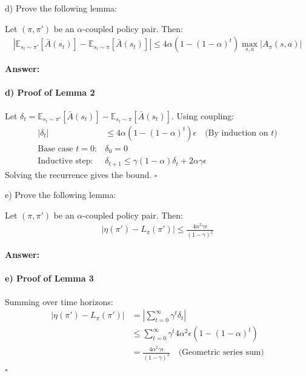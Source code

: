 d) Prove the following lemma:

\begin{lemma}
    Let $(\pi, \pi')$ be an $\alpha$-coupled policy pair. Then:
    \begin{align*}
        |\mathbb{E}_{s_t \sim \pi'}[\bar{A}(s_t)] - \mathbb{E}_{s_t \sim \pi}[\bar{A}(s_t)]| \le 4\alpha(1-(1-\alpha)^t)\max_{s, a}|A_\pi(s, a)|
    \end{align*}
\end{lemma}


\textbf{Answer:}

\paragraph{d) Proof of Lemma 2} Let $\delta_t = \mathbb{E}_{s_t \sim \pi'}[\bar{A}(s_t)] - \mathbb{E}_{s_t \sim \pi}[\bar{A}(s_t)]$. Using coupling:
\begin{align*}
|\delta_t| &\leq 4\alpha(1-(1-\alpha)^t)\epsilon \quad \text{(By induction on $t$)} \\
\text{Base case } t=0: & \delta_0 = 0 \\
\text{Inductive step: } & \delta_{t+1} \leq \gamma(1-\alpha)\delta_t + 2\alpha\gamma\epsilon
\end{align*}
Solving the recurrence gives the bound. $\square$


e) Prove the following lemma:

\begin{lemma}
    Let $(\pi, \pi')$ be an $\alpha$-coupled policy pair. Then:
    \begin{align*}
        |\eta(\pi')-L_{\pi}(\pi')| \le \frac{4\alpha^2\gamma\epsilon}{(1-\gamma)^2}
    \end{align*}
\end{lemma}


\textbf{Answer:}

\paragraph{e) Proof of Lemma 3} Summing over time horizons:
\begin{align*}
|\eta(\pi') - L_\pi(\pi')| &= \left|\sum_{t=0}^\infty \gamma^t \delta_t\right| \\
&\leq \sum_{t=0}^\infty \gamma^t 4\alpha^2\epsilon(1-(1-\alpha)^t) \\
&= \frac{4\alpha^2\gamma\epsilon}{(1-\gamma)^2} \quad \text{(Geometric series sum)}
\end{align*}
$\square$



